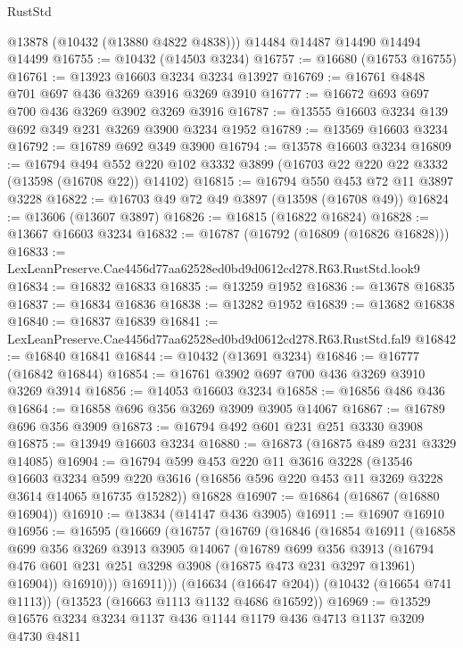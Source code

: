 \begin{lexlean}{RustStd}
\begin{coremodule}
      @13878
      (@10432 (@13880 @4822 @4838)))
    @14484
    @14487
    @14490
    @14494
    @14499
@16755 := @10432 (@14503 @3234)
@16757 := @16680 (@16753 @16755)
@16761 := @13923 @16603 @3234 @3234 @13927
@16769 := @16761 @4848 @701 @697 @436 @3269 @3916 @3269 @3910
@16777 := @16672 @693 @697 @700 @436 @3269 @3902 @3269 @3916
@16787 := @13555 @16603 @3234 @139 @692 @349 @231 @3269 @3900 @3234 @1952
@16789 := @13569 @16603 @3234
@16792 := @16789 @692 @349 @3900
@16794 := @13578 @16603 @3234
@16809 := @16794
    @494
    @552
    @220
    @102
    @3332
    @3899
    (@16703 @22 @220 @22 @3332 (@13598 (@16708 @22)) @14102)
@16815 := @16794 @550 @453 @72 @11 @3897 @3228
@16822 := @16703 @49 @72 @49 @3897 (@13598 (@16708 @49))
@16824 := @13606 (@13607 @3897)
@16826 := @16815 (@16822 @16824)
@16828 := @13667 @16603 @3234
@16832 := @16787 (@16792 (@16809 (@16826 @16828)))
@16833 := LexLeanPreserve.Cae4456d77aa62528ed0bd9d0612cd278.R63.RustStd.look9
@16834 := @16832 @16833
@16835 := @13259 @1952
@16836 := @13678 @16835
@16837 := @16834 @16836
@16838 := @13282 @1952
@16839 := @13682 @16838
@16840 := @16837 @16839
@16841 := LexLeanPreserve.Cae4456d77aa62528ed0bd9d0612cd278.R63.RustStd.fal9
@16842 := @16840 @16841
@16844 := @10432 (@13691 @3234)
@16846 := @16777 (@16842 @16844)
@16854 := @16761 @3902 @697 @700 @436 @3269 @3910 @3269 @3914
@16856 := @14053 @16603 @3234
@16858 := @16856 @486 @436
@16864 := @16858 @696 @356 @3269 @3909 @3905 @14067
@16867 := @16789 @696 @356 @3909
@16873 := @16794 @492 @601 @231 @251 @3330 @3908
@16875 := @13949 @16603 @3234
@16880 := @16873 (@16875 @489 @231 @3329 @14085)
@16904 := @16794
    @599
    @453
    @220
    @11
    @3616
    @3228
    (@13546
      @16603
      @3234
      @599
      @220
      @3616
      (@16856 @596 @220 @453 @11 @3269 @3228 @3614 @14065 @16735 @15282))
    @16828
@16907 := @16864 (@16867 (@16880 @16904))
@16910 := @13834 (@14147 @436 @3905)
@16911 := @16907 @16910
@16956 := @16595
    (@16669
      (@16757
        (@16769
          (@16846
            (@16854
              @16911
              (@16858
                @699
                @356
                @3269
                @3913
                @3905
                @14067
                (@16789
                  @699
                  @356
                  @3913
                  (@16794 @476 @601 @231 @251 @3298 @3908 (@16875 @473 @231 @3297 @13961) @16904))
                @16910)))
          @16911)))
    (@16634 (@16647 @204))
    (@10432 (@16654 @741 @1113))
    (@13523 (@16663 @1113 @1132 @4686 @16592))
@16969 := @13529 @16576 @3234 @3234 @1137 @436 @1144 @1179 @436 @4713 @1137 @3209 @4730 @4811

\end{coremodule}
\end{lexlean}
